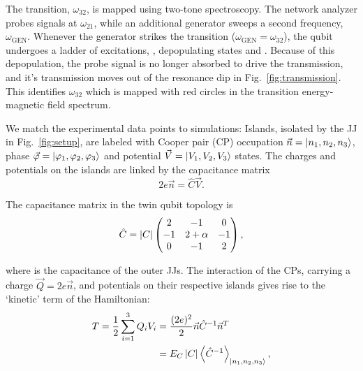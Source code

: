 The  \ilra{}  transition,  $\omega_{32}$,   is  mapped  using  two-tone
spectroscopy.   The network  analyzer probes  signals at  $ \omega_{21}  $, while  an
additional generator  sweeps a second  frequency, $ \omega_{\text{GEN}}  $.  Whenever
the      generator     strikes      the     \ira{}      transition
($\omega_{\text{GEN}}  = \omega_{32}  $), the  qubit  undergoes a  ladder of  excitations,
     ,  depopulating
states  and .  Because of this depopulation, the probe signal is
no longer  absorbed to drive  the \ilra {} transmission,  and it's
transmission  moves out  of  the resonance  dip in  Fig.~\ref{fig:transmission}.
This identifies  $\omega_{32}$ which  is mapped  with red  circles in  the transition
energy-magnetic field spectrum.


We match the  experimental data points to simulations: Islands,  isolated by the
JJ  in  Fig.~\ref{fig:setup},  are  labeled with  Cooper  pair  (CP)  occupation
$       \vec{n}      =       \Ket{n_1,      n_2,       n_3}      $,       phase
$     \vec{\varphi}     =     \Ket{\varphi_1,     \varphi_2,     \varphi_3}     $     and     potential
$ \vec{V} = \Ket{V_{1}, V_{2}, V_{3}}  $ states.  The charges and potentials on
the islands are linked by the capacitance matrix
\begin{equation}
  \label{eq:link}
  2e\vec{n} = \hat{C}\vec{V}.
\end{equation}

\noindent The capacitance matrix in the twin qubit topology is
\begin{equation}
  \label{eq:capac}
  \hat{C} = \left|C\right| \begin{pmatrix}
    2  &  -1  &  0\\
    -1  &  2  +  \alpha  &  -1\\
    0  &  -1  & 2
  \end{pmatrix},
\end{equation}

\noindent where   is the capacitance of the outer  JJs.  The interaction
of the  CPs, carrying a  charge $ \vec{Q}=2e\vec{n}  $, and potentials  on their
respective islands gives rise to the `kinetic' term of the Hamiltonian:
\begin{equation}\label{eq:kinetic}
  \begin{aligned}
    T = \frac{1}{2}\sum_{i=1}^{3}Q_iV_i & =
    \frac{(2e)^2}{2}\vec{n}\hat{C}^{-1}\vec{n}^{T}\\
    & = E_C \left|C\right| \left\langle \hat{C}^{-1} \right\rangle_{\Ket{n_{1}, n_2, n_3}},
  \end{aligned}
\end{equation}


